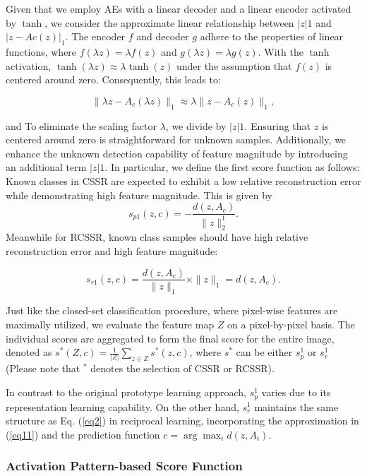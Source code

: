 \documentclass{gji}
\begin{document}
    Given that we employ AEs with a linear decoder and a linear encoder activated by $\tanh$, we consider the approximate linear relationship between $|z|{1}$ and $|z - A{c}(z)|_{1}$. The encoder $f$ and decoder $g$ adhere to the properties of linear functions, where $f(\lambda z) = \lambda f(z)$ and $g(\lambda z) = \lambda g(z)$. With the $\tanh$ activation, $\tanh(\lambda z) \approx \lambda \tanh(z)$ under the assumption that $f(z)$ is centered around zero. Consequently, this leads to:
  
    \[
    \| \lambda z - A_{c}(\lambda z) \|_{1} \approx \lambda \|z - A_{c}(z)\|_{1},
    \]
    
    and To eliminate the scaling factor $\lambda$, we divide by $|z|{1}$. Ensuring that $z$ is centered around zero is straightforward for unknown samples. Additionally, we enhance the unknown detection capability of feature magnitude by introducing an additional term $|z|{1}$.
    In particular, we define the first score function as follows: Known classes in CSSR are expected to exhibit a low relative reconstruction error while demonstrating high feature magnitude. This is given by
    \[ s_{p1}(z, c) = -\frac{d(z, A_c)}{\|z\|_{2}^{1}}. \tag{12} \label{eq12} \]
    Meanwhile for RCSSR, known class samples should have high relative reconstruction error and high feature magnitude:
    
    \[ s_{r1}(z, c) = \frac{d(z, A_c)}{\|z\|_{1}} \times \|z\|_{1} = d(z, A_c). \tag{13} \label{eq13} \]

    Just like the closed-set classification procedure, where pixel-wise features are maximally utilized, we evaluate the feature map $Z$ on a pixel-by-pixel basis. The individual scores are aggregated to form the final score for the entire image, denoted as $s^*(Z, c) = \frac{1}{|Z|} \sum_{z \in Z} s^*(z, c)$, where $s^*$ can be either $s_p^1$ or $s_r^1$ (Please note that $^*$ denotes the selection of CSSR or RCSSR).

    In contrast to the original prototype learning approach, $s_p^1$ varies due to its representation learning capability. On the other hand, $s_r^1$ maintains the same structure as Eq. (\ref{eq2}) in reciprocal learning, incorporating the approximation in (\ref{eq11}) and the prediction function $c = \arg \max_i d(z, A_i)$.

  \subsubsection{Activation Pattern-based Score Function}
\end{document}
